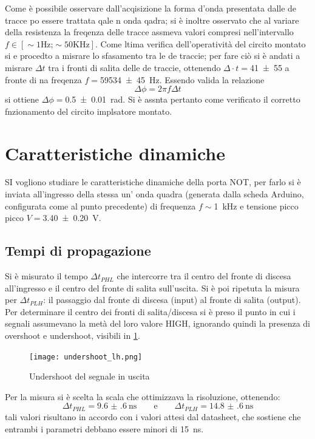 	Come è possibile osservare dall'acqisizione la forma d'onda presentata dalle de tracce po essere trattata qale n onda qadra; si è inoltre osservato che al variare della resistenza la freqenza delle tracce assmeva valori compresi nell'intervallo $f\in [\sim 1 \text{Hz;} \sim 50 \text{KHz}]$.
	Come ltima verifica dell'operatività del circito montato si e procedto a misrare lo sfasamento tra le de traccie;
	per fare ciò si è andati a misrare $\Delta t$ tra i fronti di salita delle de
	 traccie, ottenendo $\Delta \cdot t=$\SI{41 \pm 55}{\sec} a fronte di na freqenza
	  $f=$\SI{59534 \pm 45}{\hertz}.
	Essendo valida la relazione \begin{equation}
	\Delta \phi = 2 \pi f \Delta t
	\end{equation}\label{eq:sfas}
	si ottiene $\Delta \phi=$\SI{0.5 \pm 0.01}{\radian}.
	Si è assnta pertanto come verificato il corretto fnzionamento del circito implsatore montato.

\section{Caratteristiche dinamiche}
	SI vogliono studiare le caratteristiche dinamiche della porta NOT, per farlo si è inviata all'ingresso della stessa un' onda quadra (generata dalla scheda Arduino, configurata come al punto precedente) di frequenza  $f\sim$\SI{1}{\kilo \hertz} e tensione picco picco $V=$\SI{3.40 \pm 0.20}{\volt}.

	\subsection{Tempi di propagazione}
	Si è misurato il tempo $\Delta t_{PHL}$ che intercorre tra il centro del fronte di discesa all'ingresso e il centro del fronte di salita sull'uscita. Si è poi ripetuta la misura per $\Delta t_{PLH}$: il passaggio dal fronte di discesa (input) al fronte di salita (output).
	Per determinare il centro dei fronti di salita/discesa si è preso il punto in cui i segnali assumevano la metà del loro valore HIGH, ignorando quindi la presenza di overshoot e undershoot, visibili in \figurename{ \ref{f:ripple}}.

	\begin{figure}[H]
		\centering
		\texttt{[image: undershoot\_lh.png]}
		\caption{Undershoot del segnale in uscita}
		\label{f:ripple}
	\end{figure}
	\noindent Per la misura si è scelta la scala che ottimizzava la risoluzione, ottenendo:
	$$\Delta t_{PHL}=\SI{9.6(6)}{\nano \second} \qquad \text{e} \qquad \Delta t_{PLH}=\SI{14.8(6)}{\nano \second}$$
	tali valori risultano in accordo con i valori attesi dal datasheet, che sostiene che entrambi i parametri debbano essere minori di \SI{15}{\nano \second}.

